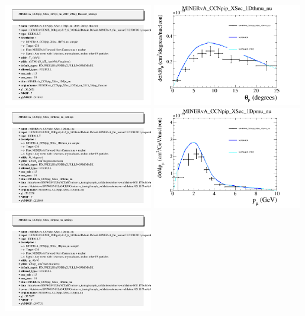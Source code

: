 \documentclass{article}
\begin{document}
\includegraphics[width=0.49\textwidth]{figures/nuisance_MINERvA_CCNpip_XSec_1DTpi_nu_2015_20deg_fluxcorr_info.png}
\centering
\includegraphics[width=0.49\textwidth]{figures/nuisance_MINERvA_CCNpip_XSec_1Dthmu_nu_comp.png}
\includegraphics[width=0.49\textwidth]{figures/nuisance_MINERvA_CCNpip_XSec_1Dthmu_nu_info.png}
\centering
\includegraphics[width=0.49\textwidth]{figures/nuisance_MINERvA_CCNpip_XSec_1Dpmu_nu_comp.png}
\includegraphics[width=0.49\textwidth]{figures/nuisance_MINERvA_CCNpip_XSec_1Dpmu_nu_info.png}
\end{document}
